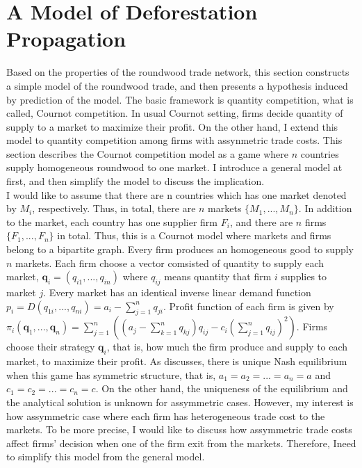 \documentclass[a4paper,12pt]{article}
\begin{document}
\section{A Model of Deforestation Propagation}
Based on the properties of the roundwood trade network, this section constructs a simple model of the roundwood trade, and then presents a hypothesis induced by prediction of the model. The basic framework is quantity competition, what is called, Cournot competition. In usual Cournot setting, firms decide quantity of supply to a market to maximize their profit. On the other hand, I extend this model to quantity competition among firms with assynmetric trade costs. This section describes the Cournot competition model as a game where $n$ countries supply homogeneous roundwood to one market. I introduce a general model at first, and then simplify the model to discuss the implication. \\

I would like to assume that there are n countries which has one market denoted by $M_i$, respectively. Thus, in total, there are $n$ markets $\{ M_1, ..., M_n \}$. In addition to the market, each country has one supplier firm $F_i$, and there are $n$ firms $\{ F_1, ..., F_n \}$ in total. Thus, this is a Cournot model where markets and firms belong to a bipartite graph. Every firm produces an homogeneous good to supply $n$ markets. Each firm choose a vector comsisted of quantity to supply each market, $\mathbf{q}_i = (q_{i1}, ..., q_{in})$ where $q_{ij}$ means quantity that firm $i$ supplies to market $j$. Every market has an identical inverse linear demand function $p_i = D(q_{1i}, ..., q_{ni}) = a_i - \sum_{j=1}^n q_{ji}$. Profit function of each firm is given by $\pi_i (\mathbf{q}_1, ..., \mathbf{q}_n) = \sum_{j = 1}^{n} ((a_j - \sum_{k=1}^n q_{kj}) q_{ij} - c_{i} (\sum_{j = 1}^{n} q_{ij} ) ^ 2 )$. Firms choose their strategy $\mathbf{q}_i$, that is, how much the firm produce and supply to each market, to maximize their profit. As \cite{bimpikis2019cournot} discusses, there is unique Nash equilibrium when this game has symmetric structure, that is, $a_1 = a_2 = ... = a_n = a$ and $c_1 = c_2 = ... = c_n = c$. On the other hand, the uniqueness of the equilibrium and the analytical solution is unknown for assymmetric cases. However, my interest is how assymmetric case where each firm has heterogeneous trade cost to the markets. To be more precise, I would like to discuss how assymmetric trade costs affect firms' decision when one of the firm exit from the markets. Therefore, Ineed to simplify this model from the general model. \\
\end{document}
